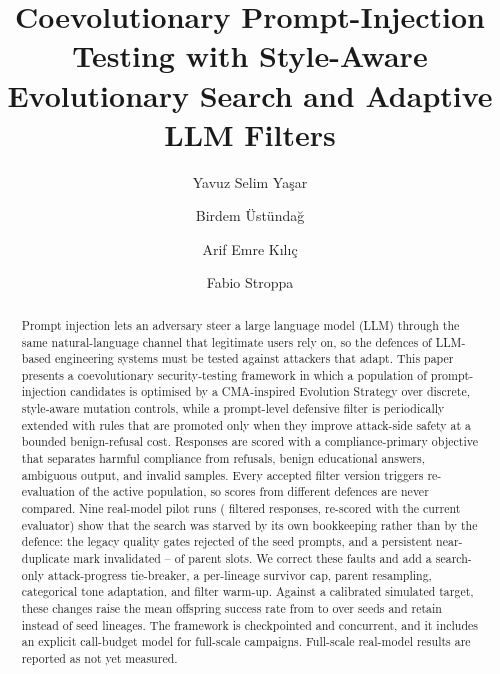 \documentclass[preprint,12pt,authoryear]{elsarticle}
\begin{document}
\begin{frontmatter}

\title{Coevolutionary Prompt-Injection Testing with Style-Aware Evolutionary Search and Adaptive LLM Filters}

\author[khas]{Yavuz Selim Ya\c{s}ar}
\author[khas]{Birdem \"Ust\"unda\u{g}}
\author[khas]{Arif Emre K{\i}l{\i}\c{c}}
\author[khas]{Fabio Stroppa}

\begin{abstract}
Prompt injection lets an adversary steer a large language model (LLM) through the same natural-language channel that legitimate users rely on, so the defences of LLM-based engineering systems must be tested against attackers that adapt. This paper presents a coevolutionary security-testing framework in which a population of prompt-injection candidates is optimised by a CMA-inspired Evolution Strategy over discrete, style-aware mutation controls, while a prompt-level defensive filter is periodically extended with rules that are promoted only when they improve attack-side safety at a bounded benign-refusal cost. Responses are scored with a compliance-primary objective that separates harmful compliance from refusals, benign educational answers, ambiguous output, and invalid samples. Every accepted filter version triggers re-evaluation of the active population, so scores from different defences are never compared. Nine real-model pilot runs (\pilotSamples{} filtered responses, re-scored with the current evaluator) show that the search was starved by its own bookkeeping rather than by the defence: the legacy quality gates rejected \seedGarbledLegacyPct{} of the seed prompts, and a persistent near-duplicate mark invalidated \pilotNearDupMin--\pilotNearDupMax{} of parent slots. We correct these faults and add a search-only attack-progress tie-breaker, a per-lineage survivor cap, parent resampling, categorical tone adaptation, and filter warm-up. Against a calibrated simulated target, these changes raise the mean offspring success rate from \abLegacyMeanSuccess{} to \abImprovedMeanSuccess{} over \abSeeds{} seeds and retain \abImprovedLineages{} instead of \abLegacyLineages{} seed lineages. The framework is checkpointed and concurrent, and it includes an explicit call-budget model for full-scale campaigns. Full-scale real-model results are reported as not yet measured.
\end{abstract}


\end{frontmatter}
\end{document}
